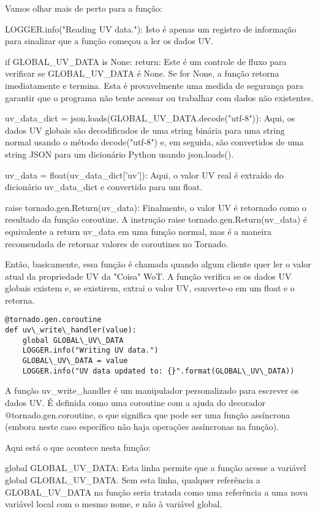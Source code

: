 Vamos olhar mais de perto para a função:

LOGGER.info("Reading UV data."): Isto é apenas um registro de informação para sinalizar que a função começou a ler os dados UV.

if GLOBAL\_UV\_DATA is None: return: Este é um controle de fluxo para verificar se GLOBAL\_UV\_DATA é None. Se for None, a função retorna imediatamente e termina. Esta é provavelmente uma medida de segurança para garantir que o programa não tente acessar ou trabalhar com dados não existentes.

uv\_data\_dict = json.loads(GLOBAL\_UV\_DATA.decode("utf-8")): Aqui, os dados UV globais são decodificados de uma string binária para uma string normal usando o método decode("utf-8") e, em seguida, são convertidos de uma string JSON para um dicionário Python usando json.loads().

uv\_data = float(uv\_data\_dict['uv']): Aqui, o valor UV real é extraído do dicionário uv\_data\_dict e convertido para um float.

raise tornado.gen.Return(uv\_data): Finalmente, o valor UV é retornado como o resultado da função coroutine. A instrução raise tornado.gen.Return(uv\_data) é equivalente a return uv\_data em uma função normal, mas é a maneira recomendada de retornar valores de coroutines no Tornado.

Então, basicamente, essa função é chamada quando algum cliente quer ler o valor atual da propriedade UV da "Coisa" WoT. A função verifica se os dados UV globais existem e, se existirem, extrai o valor UV, converte-o em um float e o retorna.

\begin{verbatim}
@tornado.gen.coroutine
def uv\_write\_handler(value):
    global GLOBAL\_UV\_DATA
    LOGGER.info("Writing UV data.")
    GLOBAL\_UV\_DATA = value
    LOGGER.info("UV data updated to: {}".format(GLOBAL\_UV\_DATA))
\end{verbatim}

A função uv\_write\_handler é um manipulador personalizado para escrever os dados UV. É definida como uma coroutine com a ajuda do decorador @tornado.gen.coroutine, o que significa que pode ser uma função assíncrona (embora neste caso específico não haja operações assíncronas na função).

Aqui está o que acontece nesta função:

global GLOBAL\_UV\_DATA: Esta linha permite que a função acesse a variável global GLOBAL\_UV\_DATA. Sem esta linha, qualquer referência a GLOBAL\_UV\_DATA na função seria tratada como uma referência a uma nova variável local com o mesmo nome, e não à variável global.

